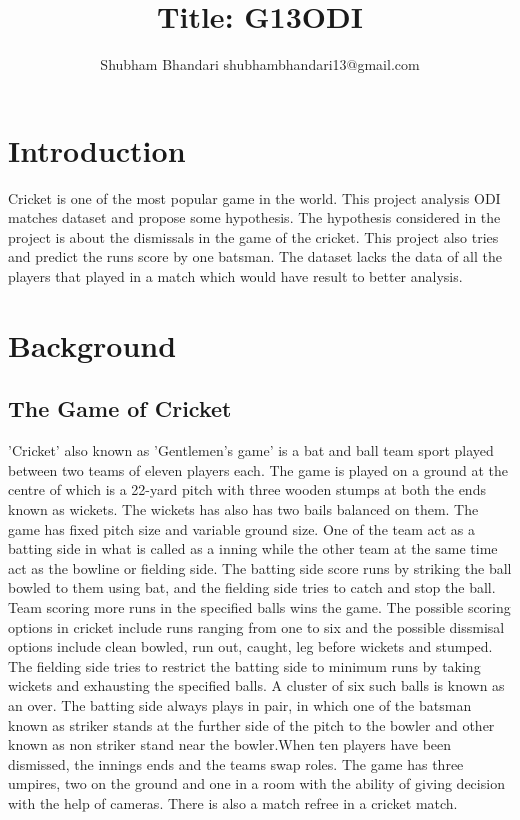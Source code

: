 \documentclass[fleqn,10pt]{wlscirep}
\title{Title: G13ODI}
\author{Shubham Bhandari shubhambhandari13@gmail.com}
\affil[]{This is project report for the subject 'CS1305: Business Intelligence' at JK Lakshmipat University, Jaipur}
\begin{document}
\flushbottom
\maketitle
\thispagestyle{empty}
\section{Introduction}
Cricket is one of the most popular game in the world. This project analysis ODI matches dataset and propose some hypothesis.
The hypothesis considered in the project is about the dismissals in the game of the cricket. This project also tries and predict
the runs score by one batsman. The dataset lacks the data of all the players that played in a match which would have result to 
better analysis.
\section{Background}
\subsection{The Game of Cricket}
'Cricket' also known as 'Gentlemen's game' is a bat and ball team sport played between two teams of eleven players each. 
The game is played on a ground at the centre of which is a 22-yard pitch with three wooden stumps at both the ends known as wickets.
The wickets has also has two bails balanced on them. The game has fixed pitch size and variable ground size. 
One of the team act as a batting side in what is called as a inning while the other team at the same time act as the bowline or fielding side.
The batting side score runs by striking the ball bowled to them using bat, and the fielding side tries to catch and stop the ball. 
Team scoring more runs in the specified balls wins the game.
The possible scoring options in cricket include runs ranging from one to six and the possible dissmisal options include clean bowled, run out, caught, leg before wickets
and stumped.
The fielding side tries to restrict the batting side to minimum runs by taking wickets and exhausting the specified balls. 
A cluster of six such balls is known as an over.
The batting side always plays in pair, in which one of the batsman known as striker stands at the further side of the pitch to the bowler and other known as non striker
stand near the bowler.When ten players have been dismissed, the innings ends and the teams swap roles. The game has three umpires, two on the ground and one in a room
with the ability of giving decision with the help of cameras. There is also a match refree in a cricket match.
\end{document}

